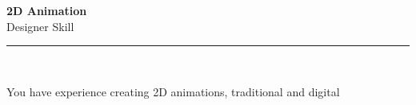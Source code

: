 \documentclass[11pt,a4paper]{memoir}
\begin{document}
    \begin{Spacing}{0.75}%
        \noindent
        \Large
        \textbf{2D Animation}\\[3pt]
        \scriptsize\color{gray}Designer Skill\\ 
        \rule{\textwidth}{.3mm}\\
        
        \vspace{3mm}
        \noindent
        \begin{minipage}[t]{53mm}
            \begin{flushleft}
            {
                \normalsize
                \begin{Spacing}{1}%
                \color{black}\textrm{You have experience creating 2D animations, traditional and digital}\\
                \end{Spacing}
            }
            \end{flushleft}
        \end{minipage}

        \vspace{5mm}
        \noindent
        \begin{minipage}[t]{53mm}
            \begin{flushleft}
            {
                \normalsize
                \begin{Spacing}{1}%
                \color{gray}\textit{}\\
                \end{Spacing}
            }
            \end{flushleft}
        \end{minipage}
    \end{Spacing}
    \clearpage
\end{document}
